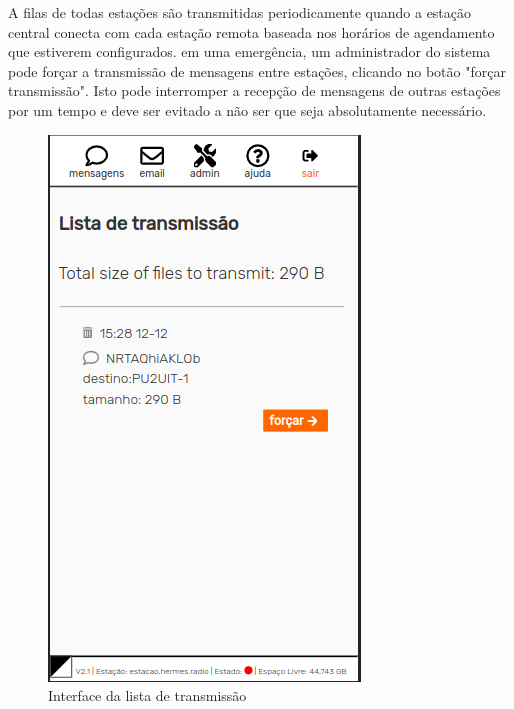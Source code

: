 \documentclass[11pt,a4paper]{article}
\begin{document}

A filas de todas estações são transmitidas periodicamente quando a estação central conecta com cada estação remota baseada nos horários de agendamento que estiverem configurados. em uma emergência, um administrador do sistema pode forçar a transmissão de mensagens entre estações, clicando no botão "forçar transmissão". Isto pode interromper a recepção de mensagens de outras estações por um tempo e deve ser evitado a não ser que seja absolutamente necessário.

    \begin{figure}[H]
    \centering
    \includegraphics[width=0.5\columnwidth]{screenshots/frontend/pt_kn/transmission.png}
    \caption{Interface da lista de transmissão}
    \label{fig:transmission}
   
    \end{figure}    
    
\end{document}
